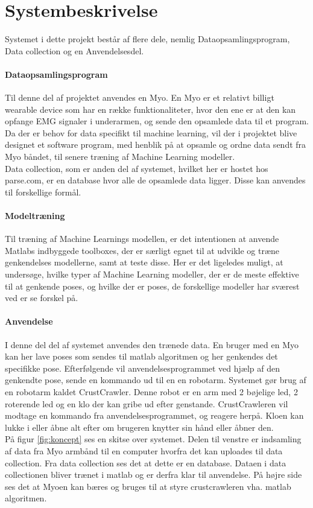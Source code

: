 \thispagestyle{fancy}
\chapter{Systembeskrivelse}
\label{chp:systembeskrivelse}

Systemet i dette projekt består af flere dele, nemlig Dataopsamlingsprogram, Data collection og en Anvendelsesdel.
\subsubsection{Dataopsamlingsprogram}
Til denne del af projektet anvendes en Myo. En Myo er et relativt billigt wearable device som har en række funktionaliteter, hvor den ene er at den kan opfange EMG signaler i underarmen, og sende den opsamlede data til et program.\\
Da der er behov for data specifikt til machine learning, vil der i projektet blive designet et software program, med henblik på at opsamle og ordne data sendt fra Myo båndet, til senere træning af Machine Learning modeller.\\
Data collection, som er anden del af systemet, hvilket her er hostet hos parse.com, er en database hvor alle de opsamlede data ligger. Disse kan anvendes til forskellige formål.

\subsubsection{Modeltræning}
Til træning af Machine Learnings modellen, er det intentionen at anvende Matlabs indbyggede toolboxes, der er særligt egnet til at udvikle og træne genkendelses modellerne, samt at teste disse. 
Her er det ligeledes muligt, at undersøge, hvilke typer af Machine Learning modeller, der er de meste effektive til at genkende poses, og hvilke der er poses, de forskellige modeller har sværest ved er se forskel på.

\subsubsection{Anvendelse}
I denne del del af systemet anvendes den trænede data. En bruger med en Myo kan her lave poses som sendes til matlab algoritmen og her genkendes det specifikke pose. Efterfølgende vil anvendelsesprogrammet ved hjælp af den genkendte pose, sende en kommando ud til en en robotarm. Systemet gør brug af en robotarm kaldet CrustCrawler. Denne robot er en arm med 2 bøjelige led, 2 roterende led og en klo der kan gribe ud efter genstande. CrustCrawleren vil modtage en kommando fra anvendelsesprogrammet, og reagere herpå. Kloen kan lukke i eller åbne alt efter om brugeren knytter sin hånd eller åbner den.\\


På figur \ref{fig:koncept} ses en skitse over systemet. Delen til venstre er indsamling af data fra Myo armbånd til en computer hvorfra det kan uploades til data collection. Fra data collection ses det at dette er en database. Dataen i data collectionen bliver trænet i matlab og er derfra klar til anvendelse. På højre side ses det at Myoen kan bæres og bruges til at styre crustcrawleren vha. matlab algoritmen.

